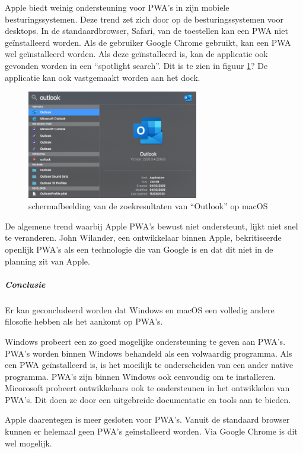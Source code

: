 		
		Apple biedt weinig ondersteuning voor PWA's in zijn mobiele besturingssystemen. Deze trend zet zich door op de besturingssystemen voor desktops. In de standaardbrowser, Safari, van de toestellen kan een PWA niet geïnstalleerd worden. Als de gebruiker Google Chrome gebruikt, kan een PWA wel geïnstalleerd worden. Als deze geïnstalleerd is, kan de applicatie ook gevonden worden in een “spotlight search”. Dit is te zien in figuur \ref{fig:screenSearchmac}? De applicatie kan ook vastgemaakt worden aan het dock.
		
		\begin{figure}[H]
			\centering
			\includegraphics[width=75mm]{./img/Outlook_search_mac.png}
			\caption{schermafbeelding van de zoekresultaten van “Outlook” op macOS}
			\label{fig:screenSearchmac}
		\end{figure}
		
		De algemene trend waarbij Apple PWA's bewust niet ondersteunt, lijkt niet snel te veranderen. John Wilander, een ontwikkelaar binnen Apple, bekritiseerde openlijk PWA's als een technologie die van Google is en dat dit niet in de planning zit van Apple. 
		\autocite{Wilander2019}
		
		
		\subparagraph{Conclusie}
		Er kan geconcludeerd worden dat Windows en macOS een volledig andere filosofie hebben als het aankomt op PWA's. 
		
		Windows probeert een zo goed mogelijke ondersteuning te geven aan PWA's. PWA's worden binnen Windows behandeld als een volwaardig programma. Als een PWA geïnstalleerd is, is het moeilijk te onderscheiden van een ander native programma.
		PWA's zijn binnen Windows ook eenvoudig om te installeren.
		Micorosoft probeert ontwikkelaars ook te ondersteunen in het ontwikkelen van PWA's. Dit doen ze door een uitgebreide documentatie en tools aan te bieden.
		
		Apple daarentegen is meer gesloten voor PWA's. Vanuit de standaard browser kunnen er helemaal geen PWA's geïnstalleerd worden. Via Google Chrome is dit wel mogelijk.
		